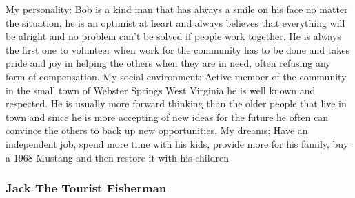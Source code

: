 My personality: 
\newline
Bob is a kind man that has always a smile on his face no matter the situation, he is an optimist at heart and always believes that everything will be alright and no problem can't be solved if people work together. He is always the first one to volunteer when work for the community has to be done and takes pride and joy in helping the others when they are in need, often refusing any form of compensation. 
\newline
My social environment: 
\newline
Active member of the community in the small town of Webster Springs West Virginia he is well known and respected. He is usually more forward thinking than the older people that live in town and since he is more accepting of new ideas for the future he often can convince the others to back up new opportunities. 
\newline
My dreams: 
\newline
Have an independent job, spend more time with his kids, provide more for his family, buy a 1968 Mustang and then restore it with his children

\subsubsection*{Jack The Tourist Fisherman}

